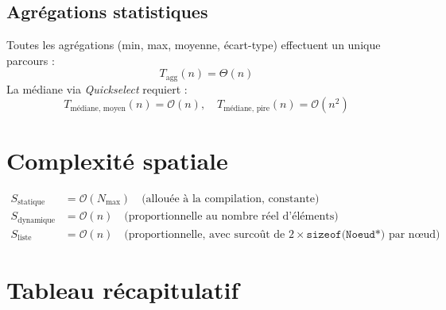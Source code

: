 \documentclass[12pt,a4paper]{report}
\begin{document}
\subsection{Agrégations statistiques}

Toutes les agrégations (min, max, moyenne, écart-type) effectuent un unique parcours :
\[
T_{\text{agg}}(n) = \Theta(n)
\]
La médiane via \emph{Quickselect} requiert :
\[
T_{\text{médiane, moyen}}(n) = \mathcal{O}(n), \quad T_{\text{médiane, pire}}(n) = \mathcal{O}(n^2)
\]

\section{Complexité spatiale}

\begin{align*}
S_{\text{statique}}  &= \mathcal{O}(N_{\max}) \quad \text{(allouée à la compilation, constante)} \\
S_{\text{dynamique}} &= \mathcal{O}(n) \quad \text{(proportionnelle au nombre réel d'éléments)} \\
S_{\text{liste}}     &= \mathcal{O}(n) \quad \text{(proportionnelle, avec surcoût de } 2\times\texttt{sizeof(Noeud*)} \text{ par nœud)}
\end{align*}

\section{Tableau récapitulatif}
\end{document}
